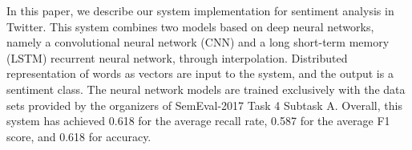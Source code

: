 In this paper, we describe our system implementation for sentiment analysis in Twitter. This system combines two models based on deep neural networks, namely a convolutional neural network (CNN) and a long short-term memory (LSTM) recurrent neural network, through interpolation. Distributed representation of words as vectors are input to the system, and the output is a sentiment class. The neural network models are trained exclusively with the data sets provided by the organizers of SemEval-2017 Task 4 Subtask A. Overall, this system has achieved 0.618 for the average recall rate, 0.587 for the average F1 score, and 0.618 for accuracy.
